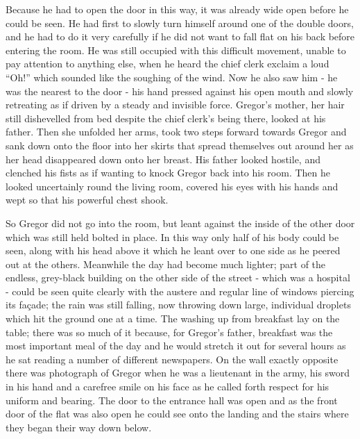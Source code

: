 \documentclass[12pt]{report}
\begin{document}
Because he had to open the door in this way, it was already wide open
before he could be seen. He had first to slowly turn himself around one
of the double doors, and he had to do it very carefully if he did not
want to fall flat on his back before entering the room. He was still
occupied with this difficult movement, unable to pay attention to
anything else, when he heard the chief clerk exclaim a loud ``Oh!''
which sounded like the soughing of the wind. Now he also saw him - he
was the nearest to the door - his hand pressed against his open mouth
and slowly retreating as if driven by a steady and invisible force.
Gregor's mother, her hair still dishevelled from bed despite the chief
clerk's being there, looked at his father. Then she unfolded her arms,
took two steps forward towards Gregor and sank down onto the floor into
her skirts that spread themselves out around her as her head disappeared
down onto her breast. His father looked hostile, and clenched his fists
as if wanting to knock Gregor back into his room. Then he looked
uncertainly round the living room, covered his eyes with his hands and
wept so that his powerful chest shook.

So Gregor did not go into the room, but leant against the inside of the
other door which was still held bolted in place. In this way only half
of his body could be seen, along with his head above it which he leant
over to one side as he peered out at the others. Meanwhile the day had
become much lighter; part of the endless, grey-black building on the
other side of the street - which was a hospital - could be seen quite
clearly with the austere and regular line of windows piercing its
façade; the rain was still falling, now throwing down large, individual
droplets which hit the ground one at a time. The washing up from
breakfast lay on the table; there was so much of it because, for
Gregor's father, breakfast was the most important meal of the day and he
would stretch it out for several hours as he sat reading a number of
different newspapers. On the wall exactly opposite there was photograph
of Gregor when he was a lieutenant in the army, his sword in his hand
and a carefree smile on his face as he called forth respect for his
uniform and bearing. The door to the entrance hall was open and as the
front door of the flat was also open he could see onto the landing and
the stairs where they began their way down below.
\end{document}
